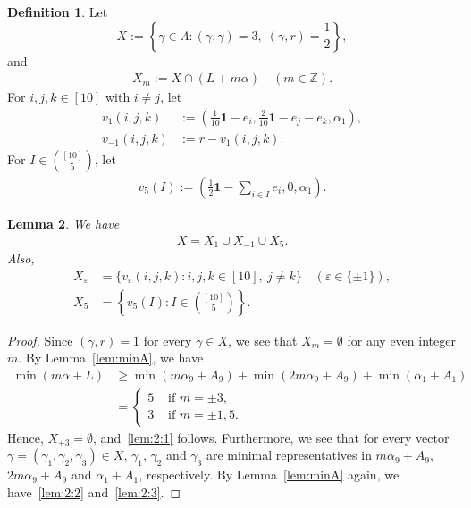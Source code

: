 \documentclass[reqno, 11pt]{amsart}
\numberwithin{equation}{section}
\newtheorem{lem}{Lemma}[section]
\theoremstyle{definition}
\newtheorem{dfn}[lem]{Definition}%
\newcommand{\Z}{\mathbb{Z}}
\newcommand{\allone}{\mathbf{1}}
\newcommand{\inp}[1]{( #1 )}
\newcommand{\sr}{ r } %
\begin{document}
\begin{dfn}
	Let \[X:=\left\{\gamma\in\Lambda :  \inp{\gamma,\gamma}=3,\; \inp{\gamma,\sr}=\frac12\right\},\]
	and
	\begin{align}
		X_m:=X\cap(L+m \alpha) \quad(m\in\Z).
	\end{align}
	For $i, j,  k \in [10]$ with  $i \neq j$, let
	\begin{align*}
		v_1(i,j,k)    & := \left(\frac{1}{10}\allone-e_i,\frac{2}{10}\allone-e_j-e_k,\alpha_1\right), \\
		v_{-1}(i,j,k) & := \sr- v_1(i,j,k).
	\end{align*}
	For $I\in\binom{[10]}{5}$, let
	\begin{align*}
		v_5(I) := \left(\frac{1}{2}\allone-\sum_{i\in I}e_i,0,\alpha_1\right).
	\end{align*}
\end{dfn}

\begin{lem}\label{lem:2}
	We have
	\begin{align}
		X=X_1\cup X_{-1}\cup X_5.	\label{lem:2:1}
	\end{align}
	Also,
	\begin{align}
		X_\varepsilon & = \{v_{\varepsilon}(i,j,k) :  i,j,k \in [10],\ j\neq k\}  \quad (\varepsilon \in \{\pm 1\}),	\label{lem:2:2} \\
		X_5           & = \left\{ v_{5}(I)  :  I \in \binom{[10]}{5} \right\}. \label{lem:2:3}
	\end{align}
\end{lem}
\begin{proof}
	Since $(\gamma, \sr) = 1$  for every $\gamma \in X$, we see that $X_m = \emptyset$ for any even integer $m$.
	By Lemma~\ref{lem:minA},
	we have
	\begin{align*}
		\min\left( m\alpha + L \right)
		 & \geq \min \left( m\alpha_9+A_9 \right) + \min \left( 2m\alpha_9+A_9 \right) + \min \left( \alpha_1+A_1 \right) \\
		 & = \begin{cases}
			     5 & \text{ if } m = \pm 3,    \\
			     3 & \text{ if } m = \pm 1, 5.
		     \end{cases}
	\end{align*}
	Hence, $X_{\pm 3} = \emptyset$, and~\eqref{lem:2:1} follows.
	Furthermore, we see that for every vector $\gamma = (\gamma_1, \gamma_2, \gamma_3) \in X$, $\gamma_1$, $\gamma_2$ and $\gamma_3$ are minimal representatives in $m\alpha_9 + A_9$, $2m\alpha_9 + A_9$ and $\alpha_1+A_1$, respectively.
	By Lemma~\ref{lem:minA} again, we have~\eqref{lem:2:2} and~\eqref{lem:2:3}.
\end{proof}
\end{document}

